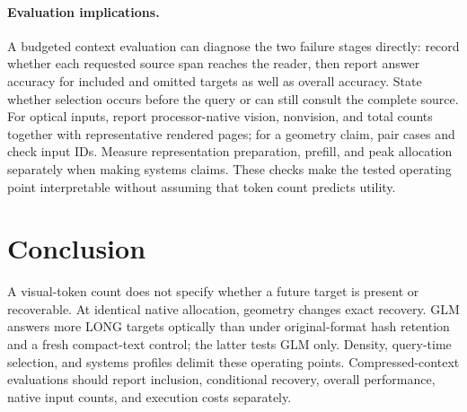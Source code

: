 \documentclass{article}
\begin{document}
\paragraph{Evaluation implications.}
A budgeted context evaluation can diagnose the two failure stages directly: record whether each requested source span reaches the reader, then report answer accuracy for included and omitted targets as well as overall accuracy. State whether selection occurs before the query or can still consult the complete source. For optical inputs, report processor-native vision, nonvision, and total counts together with representative rendered pages; for a geometry claim, pair cases and check input IDs. Measure representation preparation, prefill, and peak allocation separately when making systems claims. These checks make the tested operating point interpretable without assuming that token count predicts utility.

\section{Conclusion}
A visual-token count does not specify whether a future target is present or recoverable. At identical native allocation, geometry changes exact recovery. GLM answers more LONG targets optically than under original-format hash retention and a fresh compact-text control; the latter tests GLM only. Density, query-time selection, and systems profiles delimit these operating points. Compressed-context evaluations should report inclusion, conditional recovery, overall performance, native input counts, and execution costs separately.

\label{maintextend}


\clearpage
\appendix

\end{document}
